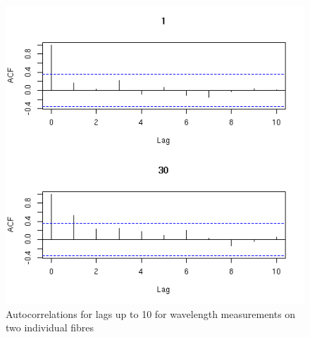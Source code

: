 %

\begin{figure}[!h]
  \centering
  \includegraphics[width=1.0\textwidth]{figacf.png}
  \caption{Autocorrelations for lags up to 10 for wavelength measurements on two individual fibres}
  \label{fig:acf}
\end{figure}

%

